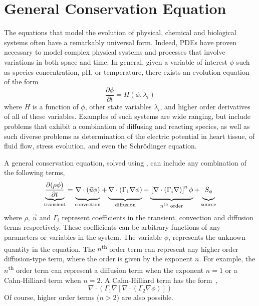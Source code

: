 \section{General Conservation Equation}
\label{sec:GeneralConservationEquation}

The equations that model the evolution of physical, chemical and
biological systems often have a remarkably universal form.  Indeed,
PDEs have proven necessary to model complex physical systems and
processes that involve variations in both space and time.  In general,
given a variable of interest \( \phi \) such as species concentration,
pH, or temperature, there exists an evolution equation of the form
\begin{equation}
  \frac{\partial \phi}{\partial t} = H(\phi, \lambda_i)
  \label{eqn:general-equation}
\end{equation}
where \( H \) is a function of \(\phi\), other state variables
\(\lambda_i\), and higher order derivatives of all of these variables.
Examples of such systems are wide ranging, but include problems that
exhibit a combination of diffusing and reacting species, as well as
such diverse problems as determination of the electric potential in
heart tissue, of fluid flow, stress evolution, and even the
Schr\"odinger equation.

A general conservation equation, solved using \FiPy{}, can include any
combination of the following terms,
\begin{equation}                        
  \underbrace{
  \frac{\partial (\rho \phi)}{\partial t}
  }_{\text{transient}}
=
\underbrace{
  \vphantom{\frac{\partial (\rho \phi)}{\partial t}}
  \nabla \cdot \left( \vec{u} \phi \right)
}_{\text{convection}}
+
\underbrace{
  \vphantom{\frac{\partial (\rho \phi)}{\partial t}}
  \nabla \cdot \left( \Gamma_1 \nabla \phi \right) 
}_{\text{diffusion}}
+
\underbrace{
  \vphantom{\frac{\partial (\rho \phi)}{\partial t}}
  \left[ \nabla \cdot \left( \Gamma_i \nabla \right) \right]^n \phi
}_{\text{$n$\textsuperscript{th} order}}
+
\underbrace{
  \vphantom{\frac{\partial (\rho \phi)}{\partial t}}
  S_{\phi}
}_{\text{source}}
\label{eqn:num:gen}
\end{equation}
where $\rho$, $\vec{u}$ and $\Gamma_i$ represent coefficients in the
transient, convection and diffusion terms respectively.  These
coefficients can be arbitrary functions of any parameters or variables
in the system.  The variable $\phi$, represents the unknown quantity
in the equation.  The $n$\textsuperscript{th} order term can represent
any higher order diffusion-type term, where the order is given by the
exponent $n$.  For example, the $n$\textsuperscript{th} order term can
represent a diffusion term when the exponent $n = 1$ or a
Cahn-Hilliard term when $n = 2$.  A Cahn-Hilliard term has the
form~\cite{CahnHilliardI,CahnHilliardII,CahnHilliardIII},
\begin{equation}
  \nabla \cdot \left( \Gamma_1 \nabla \left[ 
  \nabla \cdot \left( \Gamma_2 \nabla \phi \right) \right] \right)
  \label{eqn:cahn-hilliard}
\end{equation}
Of course, higher order terms ($n > 2$) are also possible.




